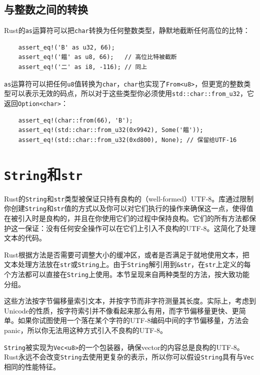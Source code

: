 
\subsection{与整数之间的转换}

Rust的\texttt{as}运算符可以把\texttt{char}转换为任何整数类型，静默地截断任何高位的比特：
\begin{verbatim}
    assert_eq!('B' as u32, 66);
    assert_eq!('饂' as u8, 66);   // 高位比特被截断
    assert_eq!('二' as i8, -116); // 同上
\end{verbatim}

\texttt{as}运算符可以把任何\texttt{u8}值转换为\texttt{char}，\texttt{char}也实现了\texttt{From<u8>}，但更宽的整数类型可以表示无效的码点，所以对于这些类型你必须使用\texttt{std::char::from\_u32}，它返回\texttt{Option<char>}：
\begin{verbatim}
    assert_eq!(char::from(66), 'B');
    assert_eq!(std::char::from_u32(0x9942), Some('饂'));
    assert_eq!(std::char::from_u32(0xd800), None); // 保留给UTF-16
\end{verbatim}
\section{\texttt{String}和\texttt{str}}

Rust的\texttt{String}和\texttt{str}类型被保证只持有良构的（well-formed）UTF-8。库通过限制你创建\texttt{String}和\texttt{str}值的方式以及你可以对它们执行的操作来确保这一点，使得值在被引入时是良构的，并且在你使用它们的过程中保持良构。它们的所有方法都保护这一保证：没有任何安全操作可以在它们上引入不良构的UTF-8。这简化了处理文本的代码。

Rust根据方法是否需要可调整大小的缓冲区，或者是否满足于就地使用文本，把文本处理方法放在\texttt{str}或\texttt{String}上。由于\texttt{String}解引用到\texttt{\&str}，在\texttt{str}上定义的每个方法都可以直接在\texttt{String}上使用。本节呈现来自两种类型的方法，按大致功能分组。

这些方法按字节偏移量索引文本，并按字节而非字符测量其长度。实际上，考虑到Unicode的性质，按字符索引并不像看起来那么有用，而字节偏移量更快、更简单。如果你试图使用一个落在某个字符的UTF-8编码中间的字节偏移量，方法会panic，所以你无法用这种方式引入不良构的UTF-8。

\texttt{String}被实现为\texttt{Vec<u8>}的一个包装器，确保vector的内容总是良构的UTF-8。Rust永远不会改变\texttt{String}去使用更复杂的表示，所以你可以假设\texttt{String}具有与\texttt{Vec}相同的性能特征。


